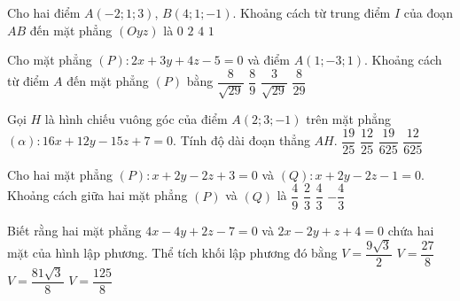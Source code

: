 \begin{ex}
	Cho hai điểm $A(-2;1;3)$, $B(4;1;-1)$. Khoảng cách từ trung điểm $I$ của đoạn $AB$ đến mặt phẳng $(Oyz)$ là
	\choice
	{$0$}
	{$2$}
	{$4$}
	{\True $1$}
\end{ex}

\begin{ex}%
	Cho mặt phẳng $(P)\colon 2x+3y+4z-5=0$ và điểm $A(1;-3;1)$. Khoảng cách từ điểm $A$ đến mặt phẳng $(P)$ bằng
	\choice
	{\True $\dfrac{8}{\sqrt{29}}$}
	{$\dfrac{8}{9}$}
	{$\dfrac{3}{\sqrt{29}}$}
	{$\dfrac{8}{29}$}
\end{ex}

\begin{ex}
	Gọi $H$ là hình chiếu vuông góc của điểm $A(2;3;-1)$ trên mặt phẳng $(\alpha)\colon 16x+12y-15z+7=0$. Tính độ dài đoạn thẳng $AH$.
	\choice
	{$\dfrac{19}{25}$}
	{\True $\dfrac{12}{25}$}
	{$\dfrac{19}{625}$}
	{$\dfrac{12}{625}$}
\end{ex}

\begin{ex}%
	Cho hai mặt phẳng $(P)\colon x+2y-2z+3=0$ và $(Q)\colon x+2y-2z-1=0$. Khoảng cách giữa hai mặt phẳng $(P)$ và $(Q)$ là 
	\choice 
	{$\dfrac{4}{9}$}
	{$\dfrac{2}{3}$}
	{\True $\dfrac{4}{3}$}
	{$-\dfrac{4}{3}$}
	
\end{ex}

\begin{ex}
	Biết rằng hai mặt phẳng $4x-4y+2z-7=0$ và $2x-2y+z+4=0$ chứa hai mặt của hình lập phương. Thể tích khối lập phương đó bằng
	\choice
	{$V=\dfrac{9 \sqrt{3}}{2}$}
	{$V=\dfrac{27}{8}$}
	{$V=\dfrac{81 \sqrt{3}}{8}$}
	{\True $V=\dfrac{125}{8}$}
\end{ex}

